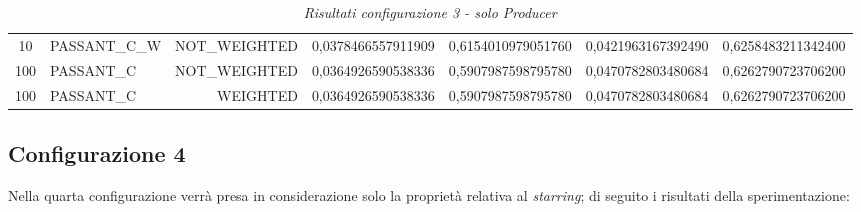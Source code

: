 \begin{table}[H]
{\begin{tabular}{ c l r c c c c }
				10 & PASSANT\_C\_W & NOT\_WEIGHTED & 0,0378466557911909 & 0,6154010979051760 & 0,0421963167392490 & 0,6258483211342400 \\
				
				100 &  PASSANT\_C & NOT\_WEIGHTED & 0,0364926590538336 & 0,5907987598795780 & 0,0470782803480684 & 0,6262790723706200 \\
				
				100 &  PASSANT\_C &   WEIGHTED & 0,0364926590538336 & 0,5907987598795780 & 0,0470782803480684 & 0,6262790723706200 \\
			\bottomrule
		\end{tabular}  
		}
	\caption{\emph{Risultati configurazione 3 - solo Producer}}
\end{table} 

\subsection{Configurazione 4}
Nella quarta configurazione verrà presa in considerazione solo la proprietà relativa al \emph{starring}; di seguito i risultati della sperimentazione:


